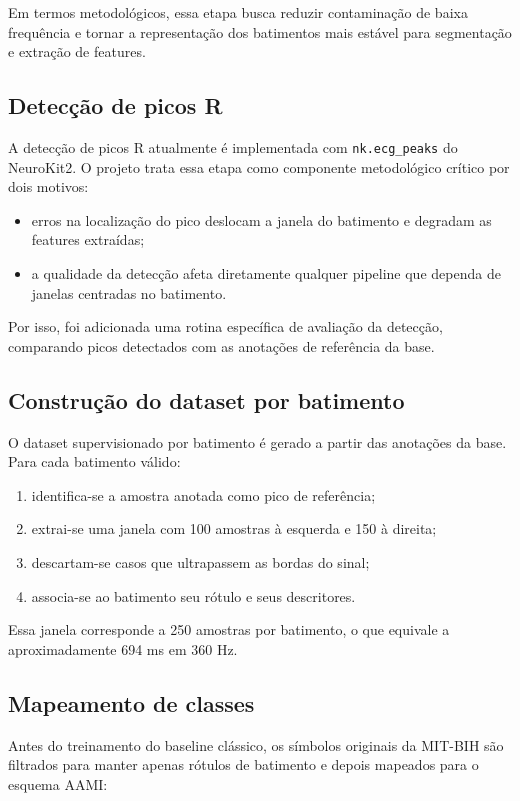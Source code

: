 \documentclass[12pt,a4paper]{article}
\begin{document}
Em termos metodol\'ogicos, essa etapa busca reduzir contamina\c{c}\~ao de baixa frequ\^encia e tornar a representa\c{c}\~ao dos batimentos mais est\'avel para segmenta\c{c}\~ao e extra\c{c}\~ao de features.

\subsection{Detec\c{c}\~ao de picos R}
A detec\c{c}\~ao de picos R atualmente \'e implementada com \texttt{nk.ecg\_peaks} do NeuroKit2. O projeto trata essa etapa como componente metodol\'ogico cr\'itico por dois motivos:

\begin{itemize}
    \item erros na localiza\c{c}\~ao do pico deslocam a janela do batimento e degradam as features extra\'idas;
    \item a qualidade da detec\c{c}\~ao afeta diretamente qualquer pipeline que dependa de janelas centradas no batimento.
\end{itemize}

Por isso, foi adicionada uma rotina espec\'ifica de avalia\c{c}\~ao da detec\c{c}\~ao, comparando picos detectados com as anota\c{c}\~oes de refer\^encia da base.

\subsection{Constru\c{c}\~ao do dataset por batimento}
O dataset supervisionado por batimento \'e gerado a partir das anota\c{c}\~oes da base. Para cada batimento v\'alido:

\begin{enumerate}[label=\arabic*.]
    \item identifica-se a amostra anotada como pico de refer\^encia;
    \item extrai-se uma janela com 100 amostras \`a esquerda e 150 \`a direita;
    \item descartam-se casos que ultrapassem as bordas do sinal;
    \item associa-se ao batimento seu r\'otulo e seus descritores.
\end{enumerate}

Essa janela corresponde a 250 amostras por batimento, o que equivale a aproximadamente 694 ms em 360 Hz.

\subsection{Mapeamento de classes}
Antes do treinamento do baseline cl\'assico, os s\'imbolos originais da MIT-BIH s\~ao filtrados para manter apenas r\'otulos de batimento e depois mapeados para o esquema AAMI:
\end{document}
